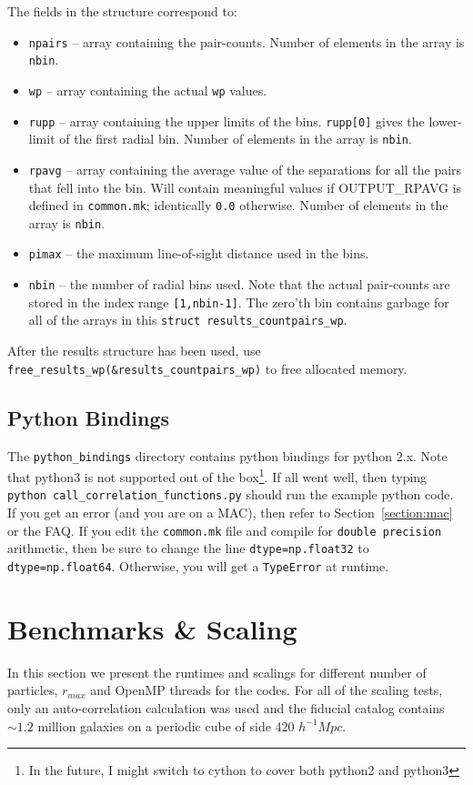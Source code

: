 \documentclass[12pt,titlepage,justified]{article}
\let\stdsection\section
\newcommand{\rmax}{\ensuremath{{r_{max}}}\xspace}
\newcommand{\hMpc}{\ensuremath{{h^{-1}Mpc}\xspace}}
\begin{document}
The fields in the structure correspond to:
\begin{itemize}
\item \texttt{npairs} -- array containing the pair-counts.  Number of elements in the array is \texttt{nbin}.
\item \texttt{wp}     -- array containing the actual \texttt{wp} values. 
\item \texttt{rupp}   -- array containing the upper limits of the bins. \texttt{rupp[0]} gives the lower-limit of the first radial bin. Number of elements 
in the array is \texttt{nbin}. 
\item \texttt{rpavg}  -- array containing the average value of the separations for all the pairs that fell into the bin. Will contain 
meaningful values if OUTPUT\_RPAVG is defined in \texttt{common.mk}; identically \texttt{0.0} otherwise. Number of elements in the array is \texttt{nbin}.
\item \texttt{pimax}  -- the maximum line-of-sight distance used in the bins. 
\item \texttt{nbin}   -- the number of radial bins used. Note that the actual pair-counts are stored in the index range \texttt{[1,nbin-1]}. The
zero'th bin contains garbage for all of the arrays in this \texttt{struct results\_countpairs\_wp}.
\end{itemize}
After the results structure has been used, use \texttt{free\_results\_wp(\&results\_countpairs\_wp)} to free allocated memory. 

\subsection{Python Bindings}
The \texttt{python\_bindings} directory contains python bindings for python 2.x. Note that python3 is not supported out of the box\footnote{In the future, I might switch to 
cython to cover both python2 and python3}. If all went well, then typing \texttt{python call\_correlation\_functions.py} should run the example python code. If you get 
an error (and you are on a MAC), then refer to Section~\ref{section:mac} or the FAQ. 
If you edit the \texttt{common.mk} file and compile for \texttt{double precision} arithmetic, then be sure to change the line \texttt{dtype=np.float32} to 
\texttt{dtype=np.float64}. Otherwise, you will get a \texttt{TypeError} at runtime. 

\stdsection{Benchmarks \& Scaling}
In this section we present the runtimes and scalings for different number of particles, \rmax and OpenMP threads for the codes. 
For all of the scaling tests, only an auto-correlation calculation was used and the fiducial catalog contains $\sim 1.2$ million 
galaxies on a periodic cube of side 420 \hMpc. 
\end{document}
